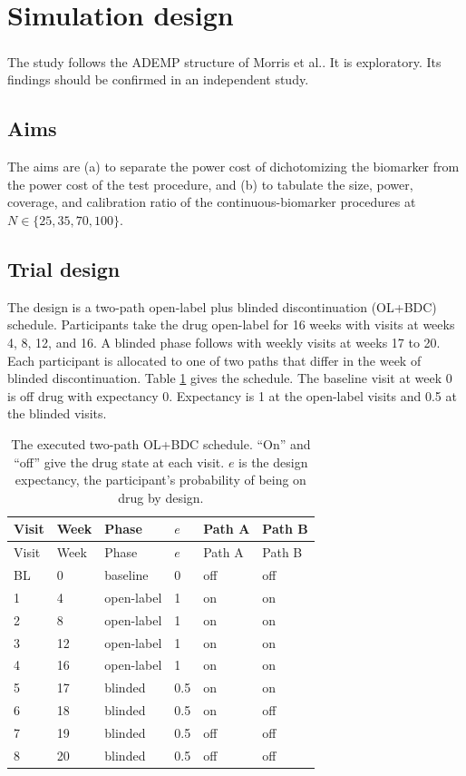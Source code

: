 \documentclass[
  11pt,
]{article}
\begin{document}
\section{Simulation design}\label{sec-design}

The study follows the ADEMP structure of Morris et al.\textsuperscript{}. It is
exploratory. Its findings should be confirmed in an independent
study.

\subsection{Aims}\label{aims}

The aims are (a) to separate the power cost of dichotomizing the
biomarker from the power cost of the test procedure, and (b) to
tabulate the size, power, coverage, and calibration ratio of the
continuous-biomarker procedures at \(N \in \{25, 35, 70, 100\}\).

\subsection{Trial design}\label{sec-trial-design}

The design is a two-path open-label plus blinded discontinuation
(OL+BDC) schedule. Participants take the drug open-label for 16
weeks with visits at weeks 4, 8, 12, and 16. A blinded phase follows
with weekly visits at weeks 17 to 20. Each participant is allocated
to one of two paths that differ in the week of blinded
discontinuation. Table \ref{tab:visits} gives the schedule. The
baseline visit at week 0 is off drug with expectancy 0. Expectancy
is 1 at the open-label visits and 0.5 at the blinded visits.

\begin{longtable}[]{@{}llllll@{}}
\caption{\label{tab:visits} The executed two-path OL+BDC schedule. ``On''
and ``off'' give the drug state at each visit. \(e\) is the design
expectancy, the participant's probability of being on drug by
design.}\tabularnewline
\toprule\noalign{}
Visit & Week & Phase & \(e\) & Path A & Path B \\
\midrule\noalign{}
\endfirsthead
\toprule\noalign{}
Visit & Week & Phase & \(e\) & Path A & Path B \\
\midrule\noalign{}
\endhead
\bottomrule\noalign{}
\endlastfoot
BL & 0 & baseline & 0 & off & off \\
1 & 4 & open-label & 1 & on & on \\
2 & 8 & open-label & 1 & on & on \\
3 & 12 & open-label & 1 & on & on \\
4 & 16 & open-label & 1 & on & on \\
5 & 17 & blinded & 0.5 & on & on \\
6 & 18 & blinded & 0.5 & on & off \\
7 & 19 & blinded & 0.5 & off & off \\
8 & 20 & blinded & 0.5 & off & off \\
\end{longtable}
\end{document}

